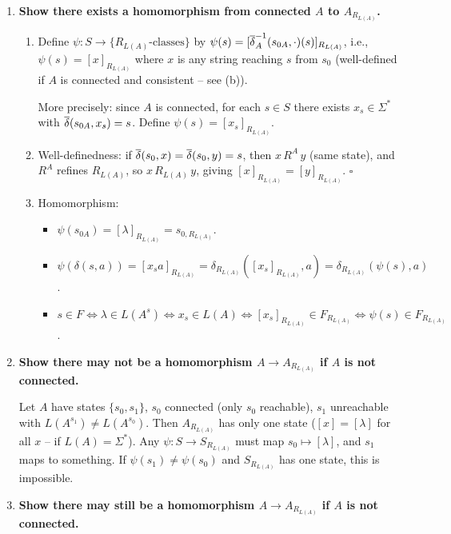 \begin{enumerate}[{3.}1.]
\item \textbf{Show there exists a homomorphism from connected $A$ to $A_{R_{L(A)}}$.}

\begin{enumerate}
\item Define $\psi: S\to\{R_{L(A)}\text{-classes}\}$ by $\psi(s)=[\overline{\delta}^{-1}_{A}(s_{0A},\cdot)(s)]_{R_{L(A)}}$, i.e., $\psi(s)=[x]_{R_{L(A)}}$ where $x$ is any string reaching $s$ from $s_0$ (well-defined if $A$ is connected and consistent -- see (b)).

More precisely: since $A$ is connected, for each $s\in S$ there exists $x_s\in\Sigma^*$ with $\overline{\delta}(s_{0A},x_s)=s$. Define $\psi(s)=[x_s]_{R_{L(A)}}$.

\item Well-definedness: if $\overline{\delta}(s_0,x)=\overline{\delta}(s_0,y)=s$, then $x\,R^A\,y$ (same state), and $R^A$ refines $R_{L(A)}$, so $x\,R_{L(A)}\,y$, giving $[x]_{R_{L(A)}}=[y]_{R_{L(A)}}$. $\square$

\item Homomorphism:
\begin{itemize}
\item $\psi(s_{0A})=[\lambda]_{R_{L(A)}}=s_{0,R_{L(A)}}$. \checkmark
\item $\psi(\delta(s,a))=[x_s a]_{R_{L(A)}}=\delta_{R_{L(A)}}([x_s]_{R_{L(A)}},a)=\delta_{R_{L(A)}}(\psi(s),a)$. \checkmark
\item $s\in F\Leftrightarrow\lambda\in L(A^s)\Leftrightarrow x_s\in L(A)\Leftrightarrow[x_s]_{R_{L(A)}}\in F_{R_{L(A)}}\Leftrightarrow\psi(s)\in F_{R_{L(A)}}$. \checkmark
\end{itemize}
\end{enumerate}

\item \textbf{Show there may not be a homomorphism $A\to A_{R_{L(A)}}$ if $A$ is not connected.}

Let $A$ have states $\{s_0,s_1\}$, $s_0$ connected (only $s_0$ reachable), $s_1$ unreachable with $L(A^{s_1})\neq L(A^{s_0})$. Then $A_{R_{L(A)}}$ has only one state ($[x]=[\lambda]$ for all $x$ -- if $L(A)=\Sigma^*$). Any $\psi: S\to S_{R_{L(A)}}$ must map $s_0\mapsto[\lambda]$, and $s_1$ maps to something. If $\psi(s_1)\neq\psi(s_0)$ and $S_{R_{L(A)}}$ has one state, this is impossible.

\item \textbf{Show there may still be a homomorphism $A\to A_{R_{L(A)}}$ if $A$ is not connected.}


\end{enumerate}
